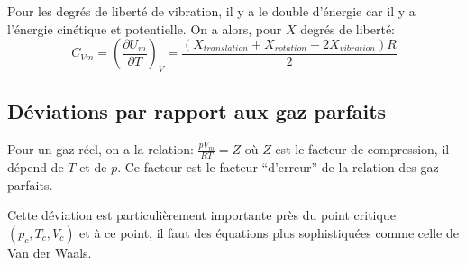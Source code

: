 Pour les degrés de liberté de vibration, il y a le double d'énergie car il y a l'énergie cinétique et potentielle.
On a alors, pour $X$ degrés de liberté:
$$ C_{Vm} = (\frac{\partial U_m}{\partial T})_V = \frac{(X_{translation} + X_{rotation} + 2X_{vibration})R}{2}$$ 

\subsection{Déviations par rapport aux gaz parfaits}
Pour un gaz réel, on a la relation: $\frac{pV_m}{RT} = Z$ où $Z$ est le facteur de compression, il dépend de $T$ et de $p$. Ce facteur est le facteur ``d'erreur'' de la relation des gaz parfaits.

Cette déviation est particulièrement importante près du point critique $(p_c, T_c, V_c)$ et à ce point, il faut des équations plus sophistiquées comme celle de Van der Waals.


